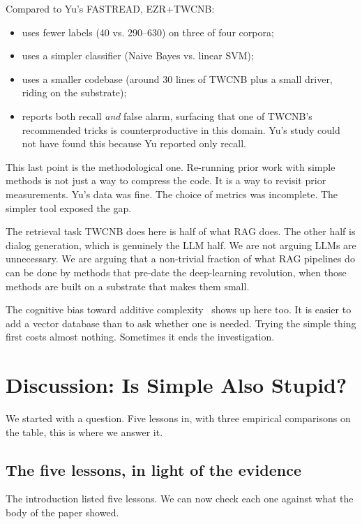 \documentclass[AMA,STIX2COL]{WileyNJDv5}
\newcommand{\IT}{{\sffamily EZR}}
\begin{document}
Compared to Yu's FASTREAD, \IT{}+TWCNB:

\begin{itemize}
\item uses fewer labels (40 vs. 290--630) on three of four
corpora;
\item uses a simpler classifier (Naive Bayes vs. linear SVM);
\item uses a smaller codebase (around 30 lines of TWCNB plus a
small driver, riding on the substrate);
\item reports both recall {\em and} false alarm, surfacing that
one of TWCNB's recommended tricks is counterproductive in this
domain. Yu's study could not have found this because Yu reported
only recall.
\end{itemize}

This last point is the methodological one. Re-running prior
work with simple methods is not just a way to compress the code.
It is a way to revisit prior measurements. Yu's data was fine.
The choice of metrics was incomplete. The simpler tool exposed
the gap.

The retrieval task TWCNB does here is half of what RAG does.
The other half is dialog generation, which is genuinely the LLM
half. We are not arguing LLMs are unnecessary. We are arguing
that a non-trivial fraction of what RAG pipelines do can be
done by methods that pre-date the deep-learning revolution,
when those methods are built on a substrate that makes them
small.

The cognitive bias toward additive complexity~\cite{adams2021people}
shows up here too. It is easier to add a vector database than
to ask whether one is needed. Trying the simple thing first
costs almost nothing. Sometimes it ends the investigation.


\section{Discussion: Is Simple Also Stupid?}\label{sec:disc}

We started with a question. Five lessons in, with three
empirical comparisons on the table, this is where we answer it.

\subsection{The five lessons, in light of the evidence}

The introduction listed five lessons. We can now check each one
against what the body of the paper showed.
\end{document}
